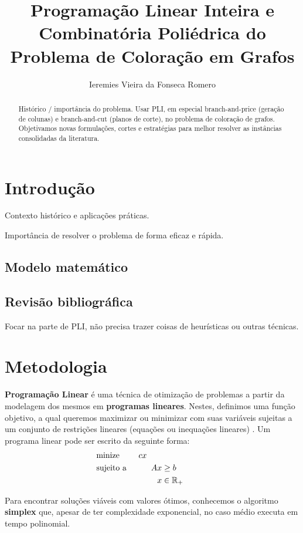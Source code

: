 \documentclass[11pt]{article}
\author{Ieremies Vieira da Fonseca Romero}
\date{}
\title{Programação Linear Inteira e Combinatória Poliédrica do Problema de Coloração em Grafos}
\begin{document}
\maketitle
\begin{abstract}
Histórico / importância do problema.
Usar PLI, em especial branch-and-price (geração de colunas) e branch-and-cut (planos de corte), no problema de coloração de grafos.
Objetivamos novas formulações, cortes e estratégias para melhor resolver as instâncias consolidadas da literatura.
\end{abstract}

\section{Introdução}
\label{sec:org02ef118}
Contexto histórico e aplicações práticas.

Importância de resolver o problema de forma eficaz e rápida.
\subsection{Modelo matemático}
\label{sec:org819d311}
\subsection{Revisão bibliográfica}
\label{sec:org72f7fa8}
Focar na parte de PLI, não precisa trazer coisas de heurísticas ou outras técnicas.
\section{Metodologia}
\label{sec:orgb12a785}

\textbf{Programação Linear} é uma técnica de otimização de problemas a partir da modelagem dos mesmos em \textbf{programas lineares}.
Nestes, definimos uma função objetivo, a qual queremos maximizar ou minimizar com suas variáveis sujeitas a um conjunto de restrições lineares (equações ou inequações lineares) \autocite{Chvatal1983LinearProgramming} . Um programa linear pode ser escrito da seguinte forma:
\begin{alignat*}{4}
& \omit\rlap{minize \quad \quad $\displaystyle cx$} \\
& \mbox{sujeito a}&& \quad & Ax & \geq b  & \quad &  \\
&                 &&       & x               & \in \mathbb{R}_+ &      &
\end{alignat*}

Para encontrar soluções viáveis com valores ótimos, conhecemos o algoritmo \textbf{simplex} que, apesar de ter complexidade exponencial, no caso médio executa em tempo polinomial.
\end{document}
